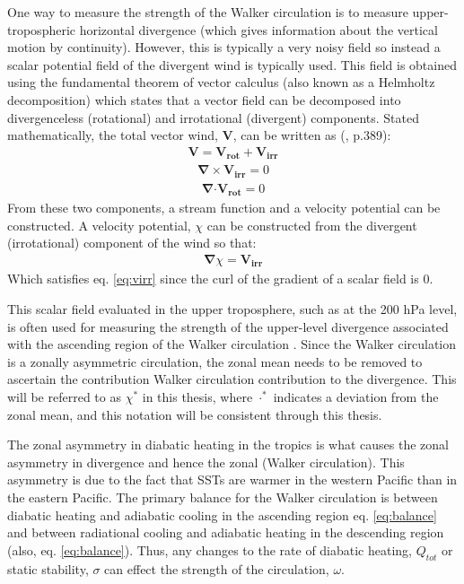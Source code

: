 \documentclass[letterpaper,12pt,titlepage,oneside,final]{book}
\begin{document}
One way to measure the strength of the Walker circulation is to measure upper-tropospheric horizontal divergence (which gives information about the vertical motion by continuity). However, this is typically a very noisy field so instead a scalar potential field of the divergent wind is typically used. This field is obtained using the fundamental theorem of vector calculus (also known as a Helmholtz decomposition) which states that a vector field can be decomposed into divergenceless (rotational) and irrotational (divergent) components. Stated mathematically, the total vector wind, $\mathbf{V}$, can be written as (\citep{holton_introduction_2004}, p.389):
\begin{align}
\mathbf{V}=\mathbf{V_{rot}}+\mathbf{V_{irr}}
\end{align}
\begin{align}\label{eq:virr}
\mathbf{\nabla} \times \mathbf{V_{irr}} = 0
\end{align}
\begin{align}
\mathbf{\nabla} \boldsymbol{\cdot}\mathbf{V_{rot}} = 0
\end{align}
From these two components, a stream function and a velocity potential can be constructed.
A velocity potential, $\chi$ can be constructed from the divergent (irrotational) component of the wind so that:
\begin{align}\label{eq:chi}
\mathbf{\nabla}\chi=\mathbf{V_{irr}}
\end{align}
Which satisfies eq. \ref{eq:virr} since the curl of the gradient of a scalar field is 0. 

This scalar field evaluated in the upper troposphere, such as at the 200 hPa level, is often used for measuring the strength of the upper-level divergence associated with the ascending region of the Walker circulation \citep{tanaka_trend_2004}. Since the Walker circulation is a zonally asymmetric circulation, the zonal mean needs to be removed to ascertain the contribution Walker circulation contribution to the divergence. This will be referred to as $\chi^{*}$ in this thesis, where $\cdot^{*}$ indicates a deviation from the zonal mean, and this notation will be consistent through this thesis. 

The zonal asymmetry in diabatic heating in the tropics is what causes the zonal asymmetry in divergence and hence the zonal (Walker circulation). This asymmetry is due to the fact that SSTs are warmer in the western Pacific than in the eastern Pacific. The primary balance for the Walker circulation is between diabatic heating and adiabatic cooling in the ascending region eq. \ref{eq:balance} and between radiational cooling and adiabatic heating in the descending region (also, eq. \ref{eq:balance}). Thus, any changes to the rate of diabatic heating, $Q_{tot}$ or static stability, $\sigma$ can effect the strength of the circulation, $\omega$.
\end{document}
